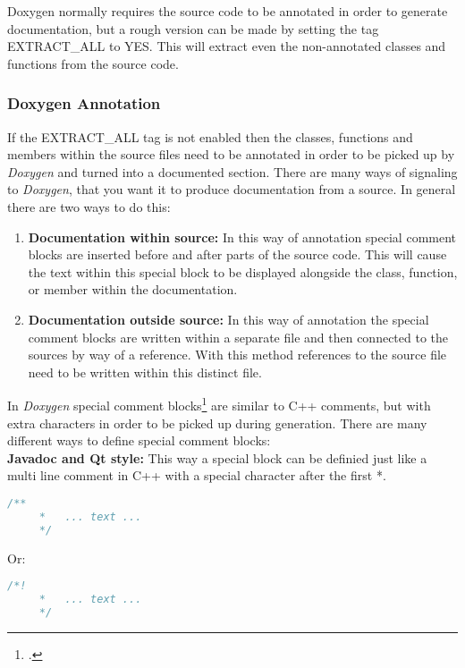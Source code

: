 Doxygen normally requires the source code to be annotated in order to generate documentation, but a rough version can be made by setting the tag EXTRACT\_ALL to YES.
This will extract even the non-annotated classes and functions from the source code.

\subsubsection{Doxygen Annotation}

If the EXTRACT\_ALL tag is not enabled then the classes, functions and members within the source files need to be annotated in order to be picked up by \textit{Doxygen}
and turned into a documented section. There are many ways of signaling to \textit{Doxygen}, that you want it to produce documentation from a source. In general there
are two ways to do this:
\begin{enumerate}
    \item \textbf{Documentation within source:} In this way of annotation special comment blocks are inserted before and after parts of the source code. 
                This will cause the text within this special block to be displayed alongside the class, function, or member within the documentation.
    \item \textbf{Documentation outside source:} In this way of annotation the special comment blocks are written within a separate file and then connected 
                to the sources by way of a reference. With this method references to the source file need to be written within this distinct file.
\end{enumerate}

In \textit{Doxygen} special comment blocks\footcite{doxygen_manual_comment_blocks} are similar to C++ comments, but with extra characters in order to be picked up during generation. There are many different 
ways to define special comment blocks:\\

\textbf{Javadoc and Qt style:} This way a special block can be definied just like a multi line comment in C++ with a special character after the first *.

\begin{minipage}{\textwidth}
\begin{lstlisting}[language=Doxygen]
    /**
     *   ... text ...
     */
\end{lstlisting}
Or:
\begin{lstlisting}[language=Doxygen]
    /*!
     *   ... text ...
     */
\end{lstlisting}
\end{minipage}
   
